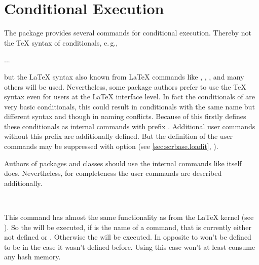 \section{Conditional Execution}
\label{sec:scrbase.if}

The package  provides several commands for conditional
execution. Thereby not the \TeX{} syntax of conditionals, e.\,g.,
\begin{lstcode}[belowskip=\dp\strutbox]
  \iftrue
    ...
  \else
    ...
  \fi
\end{lstcode}
but the \LaTeX{} syntax also known from \LaTeX{} commands like
, , , and many
others will be used. Nevertheless, some package authors prefer to use the
\TeX{} syntax even for users at the \LaTeX{} interface level. In fact the
conditionals of  are very basic conditionals, this could
result in conditionals with the same name but different syntax and though in
naming conflicts. Because of this  firstly defines these
conditionals as internal commands with prefix . Additional user
commands without this prefix are additionally defined. But the definition of
the user commands may be suppressed with option  (see
\autoref{sec:scrbase.loadit}, ).

Authors of packages and classes should use the internal commands like
\KOMAScript{} itself does. Nevertheless, for completeness the user commands
are described additionally.


\begin{Declaration}
  \\
\end{Declaration}
%
%
This command has almost the same functionality as  from
the \LaTeX{} kernel (see \cite{latex:source2e}). So the  will be executed, if  is the name of a command,
that is currently either not defined or . Otherwise the
 will be executed. In opposite to
  won't be defined to be 
in the case it wasn't defined before. Using \eTeX{} this case won't at least
consume any hash memory.%
%
%
%


